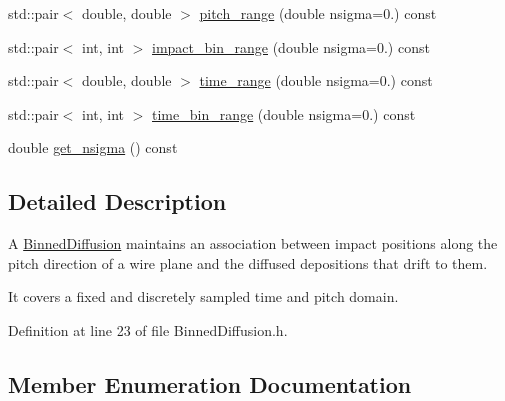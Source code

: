 \begin{DoxyCompactItemize}
\item 
std\+::pair$<$ double, double $>$ \hyperlink{class_wire_cell_1_1_gen_1_1_binned_diffusion_a8a3bc23cc2d3ba5a36bd742788920271}{pitch\+\_\+range} (double nsigma=0.) const
\item 
std\+::pair$<$ int, int $>$ \hyperlink{class_wire_cell_1_1_gen_1_1_binned_diffusion_a7b7d0d8f0c0357f7a015dce980b07afc}{impact\+\_\+bin\+\_\+range} (double nsigma=0.) const
\item 
std\+::pair$<$ double, double $>$ \hyperlink{class_wire_cell_1_1_gen_1_1_binned_diffusion_a68d4bec483da54816b4face2f8241fd8}{time\+\_\+range} (double nsigma=0.) const
\item 
std\+::pair$<$ int, int $>$ \hyperlink{class_wire_cell_1_1_gen_1_1_binned_diffusion_a5419eac4bcb3240c4345c9ddc8eb5684}{time\+\_\+bin\+\_\+range} (double nsigma=0.) const
\item 
double \hyperlink{class_wire_cell_1_1_gen_1_1_binned_diffusion_a06cf95c6488368e1ed0a88fb27309f37}{get\+\_\+nsigma} () const
\end{DoxyCompactItemize}


\subsection{Detailed Description}
A \hyperlink{class_wire_cell_1_1_gen_1_1_binned_diffusion}{Binned\+Diffusion} maintains an association between impact positions along the pitch direction of a wire plane and the diffused depositions that drift to them. \begin{DoxyVerb}It covers a fixed and discretely sampled time and pitch
domain.\end{DoxyVerb}
 

Definition at line 23 of file Binned\+Diffusion.\+h.



\subsection{Member Enumeration Documentation}
\mbox{\label{class_wire_cell_1_1_gen_1_1_binned_diffusion_a96d624fc75e70453e7e29c381850d218}} 
